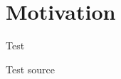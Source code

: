 \documentclass[../main.tex]{subfiles}
\begin{document}
\chapter{Motivation}\label{ch:motivation}

\epigraph{Test}{Test source}
\end{document}
